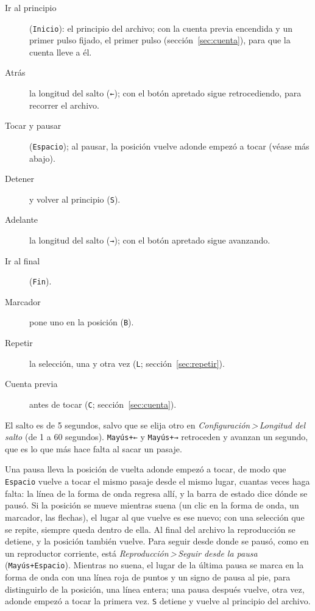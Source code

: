\documentclass[12pt,
              article,
              oneside
              ]{memoir}
\newcommand*{\menu}[1]{\textit{#1}}
\newcommand*{\then}{\,>\,}
\newcommand*{\key}[1]{\texttt{#1}}
\begin{document}
\begin{description}
\item[Ir al principio] (\key{Inicio}): el principio del archivo; con la
  cuenta previa encendida y un primer pulso fijado, el primer pulso
  (sección~\ref{sec:cuenta}), para que la cuenta lleve a él.
\item[Atrás] la longitud del salto (\key{←}); con el botón apretado sigue
  retrocediendo, para recorrer el archivo.
\item[Tocar y pausar] (\key{Espacio}); al pausar, la posición vuelve adonde
  empezó a tocar (véase más abajo).
\item[Detener] y volver al principio (\key{S}).
\item[Adelante] la longitud del salto (\key{→}); con el botón apretado
  sigue avanzando.
\item[Ir al final] (\key{Fin}).
\item[Marcador] pone uno en la posición (\key{B}).
\item[Repetir] la selección, una y otra vez (\key{L}; sección~\ref{sec:repetir}).
\item[Cuenta previa] antes de tocar (\key{C}; sección~\ref{sec:cuenta}).
\end{description}

\noindent{}%
El salto es de 5 segundos, salvo que se elija otro en
\menu{Configuración\then Longitud del salto} (de 1 a 60 segundos).
\key{Mayús+←} y \key{Mayús+→} retroceden y avanzan un segundo, que es lo
que más hace falta al sacar un pasaje.

%
Una pausa lleva la posición de vuelta adonde empezó a tocar, de modo que
\key{Espacio} vuelve a tocar el mismo pasaje desde el mismo lugar, cuantas
veces haga falta: la línea de la forma de onda regresa allí, y la barra de
estado dice dónde se pausó. Si la posición se mueve mientras suena (un clic
en la forma de onda, un marcador, las flechas), el lugar al que vuelve es
ese nuevo; con una selección que se repite, siempre queda dentro de ella.
Al final del archivo la reproducción se detiene, y la posición también
vuelve. Para seguir desde donde se pausó, como en un reproductor
corriente, está \menu{Reproducción\then Seguir desde la pausa}
(\key{Mayús+Espacio}). Mientras no suena, el lugar de la última pausa se
marca en la forma de onda con una línea roja de puntos y un signo de pausa
al pie, para distinguirlo de la posición, una línea entera; una pausa después vuelve, otra vez, adonde empezó a
tocar la primera vez. \key{S} detiene y vuelve al principio del archivo.
\end{document}
